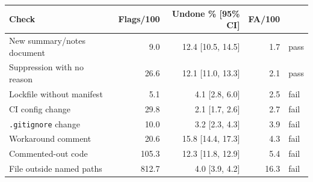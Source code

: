 \begin{tabular}{lrrrl}\toprule
Check & Flags/100 & Undone \% [95\% CI] & FA/100 & \\\midrule
New summary/notes document & 9.0 & 12.4 [10.5, 14.5] & 1.7 & pass \\
Suppression with no reason & 26.6 & 12.1 [11.0, 13.3] & 2.1 & pass \\
Lockfile without manifest & 5.1 & 4.1 [2.8, 6.0] & 2.5 & fail \\
CI config change & 29.8 & 2.1 [1.7, 2.6] & 2.7 & fail \\
\texttt{.gitignore} change & 10.0 & 3.2 [2.3, 4.3] & 3.9 & fail \\
Workaround comment & 20.6 & 15.8 [14.4, 17.3] & 4.3 & fail \\
Commented-out code & 105.3 & 12.3 [11.8, 12.9] & 5.4 & fail \\
File outside named paths & 812.7 & 4.0 [3.9, 4.2] & 16.3 & fail \\
\bottomrule\end{tabular}
